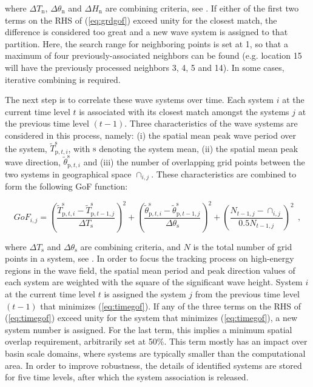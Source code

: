 where $\Delta T_\mathrm{n}$, $\Delta\theta_\mathrm{n}$ and $\Delta H_\mathrm{n}$ 
are combining criteria, see \cite{art:WHD13}. If either of 
the first two terms on the RHS of (\ref{eq:grdgof}) exceed unity for the 
closest match, the difference is considered too great and a new wave system 
is assigned to that partition. Here, the search range for neighboring 
points is set at 1, so that a maximum of four previously-associated 
neighbors can be found (e.g. location 15 will have the previously processed 
neighbors 3, 4, 5 and 14). In some cases, iterative combining is required.

The next step is to correlate these wave systems over time. Each system 
$i$ at the current time level $t$ is associated with its closest match 
amongst the systems $j$ at the previous time level $(t-1)$. Three 
characteristics of the wave systems are considered in this process, 
namely: (i) the spatial mean peak wave period over the system, 
$\tilde{T}^\mathrm{s}_{\mathrm{p},t,i}$, with $\mathrm{s}$ denoting the 
system mean, (ii) the spatial mean peak wave direction, 
$\tilde{\theta}^\mathrm{s}_{\mathrm{p},t,i}$ and (iii) the number of 
overlapping grid points between the two systems in geographical space 
$\cap_{i,j}$. These characteristics are combined to form the following 
GoF function:

\begin{equation}
    GoF_{i,j} = {\left( \frac{\tilde{T}^\mathrm{s}_{\mathrm{p},t,i} - \tilde{T}^\mathrm{s}_{\mathrm{p},t-1,j}}{\Delta T_\mathrm{s}} \right)}^2 + 
                       {\left( \frac{\tilde{\theta}^\mathrm{s}_{\mathrm{p},t,i} - \tilde{\theta}^\mathrm{s}_{\mathrm{p},t-1,j}}{\Delta\theta_\mathrm{s}} \right)}^2 +
                       {\left( \frac{N_{t-1,j} - \cap_{i,j}}{0.5N_{t-1,j}} \right)}^2\ \ ,
\label{eq:timegof}
\end{equation} 

where $\Delta T_\mathrm{s}$ and $\Delta\theta_\mathrm{s}$ are combining 
criteria, and $N$ is the total number of grid points in a system, see 
\cite{art:WHD13}. In order to focus the tracking process on 
high-energy regions in the wave field, the spatial mean period and peak 
direction values of each system are weighted with the square of the 
significant wave height. System $i$ at the current time level $t$ is 
assigned the system $j$ from the previous time level $(t-1)$ that minimizes 
(\ref{eq:timegof}). If any of the three terms on the RHS of (\ref{eq:timegof}) 
exceed unity for the system that minimizes (\ref{eq:timegof}), a new system 
number is assigned. For the last term, this implies a minimum spatial 
overlap requirement, arbitrarily set at 50\%. This term mostly has an 
impact over basin scale domains, where systems are typically smaller than 
the computational area. In order to improve robustness, the details of 
identified systems are stored for five time levels, after which the system 
association is released.


